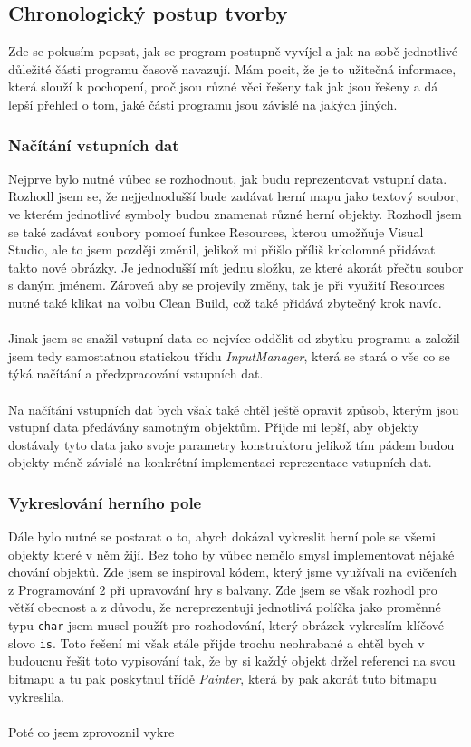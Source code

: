\documentclass[a4]{article}
\begin{document}
\subsection{Chronologický postup tvorby}
Zde se pokusím popsat, jak se program postupně vyvíjel a jak na sobě jednotlivé důležité části programu časově navazují. Mám pocit, že je to užitečná informace, která slouží k pochopení, proč jsou různé věci řešeny tak jak jsou řešeny a dá lepší přehled o tom, jaké části programu jsou závislé na jakých jiných.
\subsubsection{Načítání vstupních dat}
Nejprve bylo nutné vůbec se rozhodnout, jak budu reprezentovat vstupní data. Rozhodl jsem se, že nejjednodušší bude zadávat herní mapu jako textový soubor, ve kterém jednotlivé symboly budou znamenat různé herní objekty. Rozhodl jsem se také zadávat soubory pomocí funkce Resources, kterou umožňuje Visual Studio, ale to jsem později změnil, jelikož mi přišlo příliš krkolomné přidávat takto nové obrázky. Je jednodušší mít jednu složku, ze které akorát přečtu soubor s daným jménem. Zároveň aby se projevily změny, tak je při využití Resources nutné také klikat na volbu Clean Build, což také přidává zbytečný krok navíc. 
\\\\
Jinak jsem se snažil vstupní data co nejvíce oddělit od zbytku programu a založil jsem tedy samostatnou statickou třídu \textit{InputManager}, která se stará o vše co se týká načítání a předzpracování vstupních dat.
\\\\
Na načítání vstupních dat bych však také chtěl ještě opravit způsob, kterým jsou vstupní data předávány samotným objektům. Přijde mi lepší, aby objekty dostávaly tyto data jako svoje parametry konstruktoru jelikož tím pádem budou objekty méně závislé na konkrétní implementaci reprezentace vstupních dat.
\subsubsection{Vykreslování herního pole}
Dále bylo nutné se postarat o to, abych dokázal vykreslit herní pole se všemi objekty které v něm žijí. Bez toho by vůbec nemělo smysl implementovat nějaké chování objektů. Zde jsem se inspiroval kódem, který jsme využívali na cvičeních z Programování 2 při upravování hry s balvany. Zde jsem se však rozhodl pro větší obecnost a z důvodu, že nereprezentuji jednotlivá políčka jako proměnné typu  \verb|char| jsem musel použít pro rozhodování, který obrázek vykreslím klíčové slovo \verb|is|. Toto řešení mi však stále přijde trochu neohrabané a chtěl bych v budoucnu řešit toto vypisování tak, že by si každý objekt držel referenci na svou bitmapu a tu pak poskytnul třídě \textit{Painter}, která by pak akorát tuto bitmapu vykreslila.
\\\\
Poté co jsem zprovoznil vykre
\end{document}

